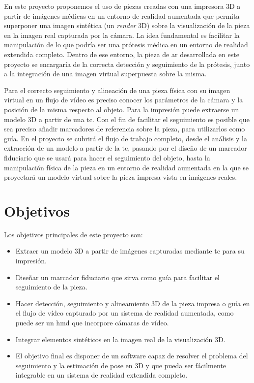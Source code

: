 En este proyecto proponemos el uso de piezas creadas con una impresora 3D a partir de imágenes médicas en un entorno de realidad aumentada que permita superponer una imagen sintética (un \emph{render} 3D) sobre la visualización de la pieza en la imagen real capturada por la cámara. La idea fundamental es facilitar la manipulación de lo que podría ser una prótesis médica en un entorno de realidad extendida completo. Dentro de ese entorno, la pieza de \acrshort{ar} desarrollada en este proyecto se encargaría de la correcta detección y seguimiento de la prótesis, junto a la integración de una imagen virtual superpuesta sobre la misma.

Para el correcto seguimiento y alineación de una pieza física con su imagen virtual en un flujo de vídeo es preciso conocer los parámetros de la cámara y la posición de la misma respecto al objeto. Para la impresión puede extraerse un modelo 3D a partir de una \acrfull{tc}. Con el fin de facilitar el seguimiento es posible que sea preciso añadir marcadores de referencia sobre la pieza, para utilizarlos como guía. En el proyecto se cubrirá el flujo de trabajo completo, desde el análisis y la extracción de un modelo a partir de la \acrshort{tc}, pasando por el diseño de un marcador fiduciario que se usará para hacer el seguimiento del objeto, hasta la manipulación física de la pieza en un entorno de realidad aumentada en la que se proyectará un modelo virtual sobre la pieza impresa vista en imágenes reales.

\section{Objetivos}
Los objetivos principales de este proyecto son:
\begin{itemize}
	\item Extraer un modelo 3D a partir de imágenes capturadas mediante \acrfull{tc} para su impresión.
	\item Diseñar un marcador fiduciario que sirva como guía para facilitar el seguimiento de la pieza.
	\item Hacer detección, seguimiento y alineamiento 3D de la pieza impresa o guía en el flujo de vídeo capturado por un sistema de realidad aumentada, como puede ser un \acrshort{hmd} que incorpore cámaras de vídeo.
	\item Integrar elementos sintéticos en la imagen real de la visualización 3D.
	\item El objetivo final es disponer de un software capaz de resolver el problema del seguimiento y la estimación de pose en 3D y que pueda ser fácilmente integrable en un sistema de realidad extendida completo.
\end{itemize}

